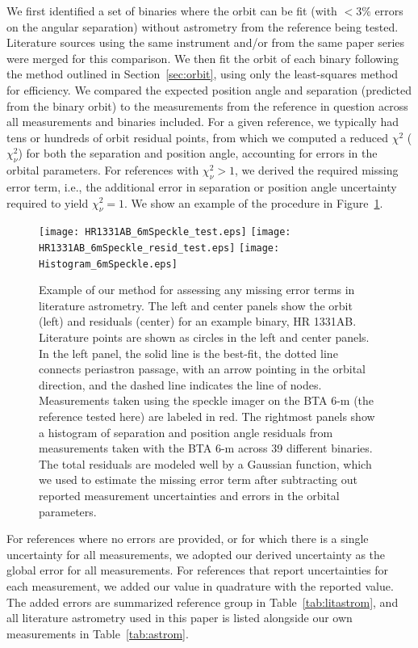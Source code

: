 \documentclass[twocolumn]{aastex62}
\begin{document}
We first identified a set of binaries where the orbit can be fit (with $<3\%$ errors on the angular separation) without astrometry from the reference being tested. Literature sources using the same instrument and/or from the same paper series were merged for this comparison. We then fit the orbit of each binary following the method outlined in Section~\ref{sec:orbit}, using only the least-squares method for efficiency. We compared the expected position angle and separation (predicted from the binary orbit) to the measurements from the reference in question across all measurements and binaries included. For a given reference, we typically had tens or hundreds of orbit residual points, from which we computed a reduced $\chi^2$ ($\chi^2_\nu$) for both the separation and position angle, accounting for errors in the orbital parameters. For references with $\chi^2_\nu > 1$, we derived the required missing error term, i.e., the additional error in separation or position angle uncertainty required to yield $\chi^2_\nu = 1$. We show an example of the procedure in Figure~\ref{fig:literr}. 


\begin{figure}[ht]
\begin{center}
\texttt{[image: HR1331AB\_6mSpeckle\_test.eps]}
\texttt{[image: HR1331AB\_6mSpeckle\_resid\_test.eps]}
\texttt{[image: Histogram\_6mSpeckle.eps]}
\caption{Example of our method for assessing any missing error terms in literature astrometry. The left and center panels show the orbit (left) and residuals (center) for an example binary, HR 1331AB. Literature points are shown as circles in the left and center panels. In the left panel, the solid line is the best-fit, the dotted line connects periastron passage, with an arrow pointing in the orbital direction, and the dashed line indicates the line of nodes. Measurements taken using the speckle imager on the BTA 6-m (the reference tested here) are labeled in red. The rightmost panels show a histogram of separation and position angle residuals from measurements taken with the BTA 6-m across 39 different binaries. The total residuals are modeled well by a Gaussian function, which we used to estimate the missing error term after subtracting out reported measurement uncertainties and errors in the orbital parameters. }
\label{fig:literr}
\end{center}
\end{figure}

For references where no errors are provided, or for which there is a single uncertainty for all measurements, we adopted our derived uncertainty as the global error for all measurements. For references that report uncertainties for each measurement, we added our value in quadrature with the reported value. The added errors are summarized reference group in Table~\ref{tab:litastrom}, and all literature astrometry used in this paper is listed alongside our own measurements in Table~\ref{tab:astrom}. 
\end{document}
